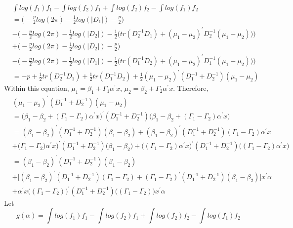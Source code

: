 \documentclass[12pt]{article}
\begin{document}
$$\begin{aligned}
& \int log(f_1) f_1 - \int log(f_2) f_1 + \int log(f_2) f_2 - \int log(f_1) f_2 \\
& =\big(-\frac{p}{2} log(2\pi) - \frac{1}{2}log(|D_1|) -\frac{p}{2}\big) \\
& -\big( -\frac{p}{2} log(2\pi) - \frac{1}{2}log(|D_2|) -\frac{1}{2}\big( tr(D_2^{-1} D_1) + (\mu_1 -\mu_2)^{\prime}D_2^{-1}(\mu_1 -\mu_2)\big)\big) \\
&+ \big(-\frac{p}{2} log(2\pi) - \frac{1}{2}log(|D_2|) -\frac{p}{2}\big) \\
&- \big(-\frac{p}{2} log(2\pi) - \frac{1}{2}log(|D_1|) -\frac{1}{2}\big( tr(D_1^{-1} D_2) + (\mu_1 -\mu_2)^{\prime}D_1^{-1}(\mu_1 -\mu_2)\big)\big) \\
& = -p + \frac{1}{2} tr(D_2^{-1} D_1) + \frac{1}{2} tr(D_1^{-1} D_2) + \frac{1}{2} (\mu_1 -\mu_2)^{\prime} (D_1^{-1} + D_2^{-1}) (\mu_1 -\mu_2)
\end{aligned}$$
Within this equation, $\mu_1 = \beta_1 + \Gamma_1 \alpha^{\prime} x$, $\mu_2 = \beta_2 + \Gamma_2 \alpha^{\prime}x$. Therefore,
$$\begin{aligned}
& (\mu_1 -\mu_2)^{\prime} (D_1^{-1} + D_2^{-1}) (\mu_1 -\mu_2) \\
& =  \big(\beta_1 - \beta_2 + (\Gamma_1 - \Gamma_2) \alpha^{\prime} x \big)^{\prime}  (D_1^{-1} + D_2^{-1}) \big(\beta_1 - \beta_2 + (\Gamma_1 - \Gamma_2) \alpha^{\prime} x \big) \\
& = (\beta_1 - \beta_2) ^{\prime}  (D_1^{-1} + D_2^{-1}) (\beta_1 - \beta_2) + (\beta_1 - \beta_2) ^{\prime}  (D_1^{-1} + D_2^{-1}) (\Gamma_1 - \Gamma_2) \alpha^{\prime} x \\
 & + \big(\Gamma_1 - \Gamma_2) \alpha^{\prime} x \big) ^{\prime}(D_1^{-1} + D_2^{-1}) \big(\beta_1 - \beta_2 \big) + \big((\Gamma_1 - \Gamma_2) \alpha^{\prime} x \big) ^{\prime}(D_1^{-1} + D_2^{-1}) \big((\Gamma_1 - \Gamma_2) \alpha^{\prime} x \big) \\
& = (\beta_1 - \beta_2) ^{\prime}  (D_1^{-1} + D_2^{-1}) (\beta_1 - \beta_2)  \\
& + \big[ (\beta_1 - \beta_2) ^{\prime}  (D_1^{-1} + D_2^{-1}) (\Gamma_1 - \Gamma_2) + (\Gamma_1 - \Gamma_2) ^{\prime}(D_1^{-1} + D_2^{-1}) (\beta_1 - \beta_2 )\big]  x^{\prime}\alpha \\
& + \alpha^{\prime} x \big((\Gamma_1 - \Gamma_2)  \big) ^{\prime}(D_1^{-1} + D_2^{-1}) \big((\Gamma_1 - \Gamma_2) \big)
x^{\prime}\alpha
\end{aligned}$$
Let 
$$g(\alpha) = \int log(f_1) f_1 - \int log(f_2) f_1 + \int log(f_2) f_2 - \int log(f_1) f_2$$
\end{document}
